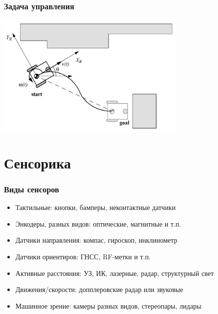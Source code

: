 \documentclass{../../slides-style}
\begin{document}
    \begin{frame}
        \frametitle{Задача управления}
        \begin{center}
            \includegraphics[width=0.7\textwidth]{inverseKinematics.png}
        \end{center}
    \end{frame}

    \section{Сенсорика}

    \begin{frame}
        \frametitle{Виды сенсоров}
        \begin{itemize}
            \item Тактильные: кнопки, бамперы, неконтактные датчики
            \item Энкодеры, разных видов: оптические, магнитные и т.п.
            \item Датчики направления: компас, гироскоп, инклинометр
            \item Датчики ориентиров: ГНСС, RF-метки и т.п.
            \item Активные расстояния: УЗ, ИК, лазерные, радар, структурный свет
            \item Движения/скорости: допплеровские радар или звуковые
            \item Машинное зрение: камеры разных видов, стереопары, лидары
        \end{itemize}
    \end{frame}
\end{document}

